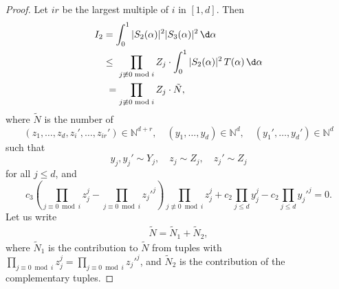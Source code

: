\begin{proof}
  Let $ir$ be the largest multiple of $i$ in $[1,d]$. Then
  \begin{align}\label{eq:I2}\begin{split}
  I_2 & = \int_{0}^1|S_2(\alpha)|^2|S_3(\alpha)|^2\, \d\alpha \\
  & \le \ \prod_{j\not \equiv 0\bmod i}Z_{j}\cdot\int_{0}^1|S_2(\alpha)|^2\,T(\alpha)\, \d\alpha\\
  & \ = \prod_{j\not \equiv 0\bmod i}Z_{j} \cdot
  \tilde N,
  \end{split}
  \end{align}
  where $\tilde N$ is the number of
  \[
  (z_1,\ldots, z_d,z_i',\ldots, z_{ir}')\in \mathbb{N}^{d+r}, \quad
  (y_1,\ldots, y_d)\in \mathbb{N}^{d},\quad
  (y_1',\ldots, y_d')\in \mathbb{N}^d
  \]
  such that
  \[
  y_j, y_j'\sim Y_j, \quad z_j \sim Z_j, \quad z_j'\sim Z_j
  \]
  for all $j\leq d$,
  and
  \[
  c_3\left(\prod_{j\equiv 0\bmod i}z_j^j-\prod_{j \equiv 0\bmod i}z_j'^j\right)\prod_{j\not \equiv 0\bmod i}z_{j}^j
  +c_2\prod_{j\leq d}y_j^j-c_2\prod_{j\leq d}y_j'^j=0.
  \]
  Let us write
  \begin{align}\label{eq:N}
  \tilde N=\tilde{N}_1+\tilde{N}_2,
  \end{align}
  where $\tilde{N}_1$ is the contribution to $\tilde N$ from tuples with $\prod_{j\equiv 0\bmod i}z_j^j= \prod_{j \equiv 0\bmod i}z_j'^j$, and $\tilde{N}_2$ is the contribution of the complementary tuples.


\end{proof}
